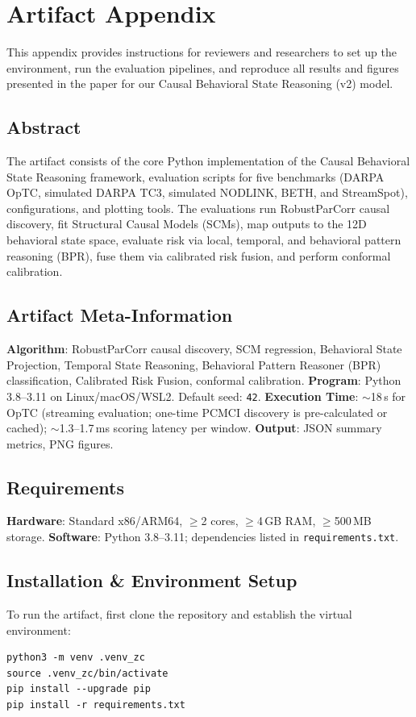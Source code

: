 \appendices

\section{Artifact Appendix}

This appendix provides instructions for reviewers and researchers to set up the environment, run the evaluation pipelines, and reproduce all results and figures presented in the paper for our Causal Behavioral State Reasoning (v2) model.

\subsection{Abstract}
The artifact consists of the core Python implementation of the Causal Behavioral State Reasoning framework, evaluation scripts for five benchmarks (DARPA OpTC, simulated DARPA TC3, simulated NODLINK, BETH, and StreamSpot), configurations, and plotting tools. The evaluations run RobustParCorr causal discovery, fit Structural Causal Models (SCMs), map outputs to the 12D behavioral state space, evaluate risk via local, temporal, and behavioral pattern reasoning (BPR), fuse them via calibrated risk fusion, and perform conformal calibration.

\subsection{Artifact Meta-Information}
\textbf{Algorithm}: RobustParCorr causal discovery, SCM regression, Behavioral State Projection, Temporal State Reasoning, Behavioral Pattern Reasoner (BPR) classification, Calibrated Risk Fusion, conformal calibration.
\textbf{Program}: Python 3.8--3.11 on Linux/macOS/WSL2. Default seed: \texttt{42}.
\textbf{Execution Time}: $\sim$18\,s for OpTC (streaming evaluation; one-time PCMCI discovery is pre-calculated or cached); $\sim$1.3--1.7\,ms scoring latency per window.
\textbf{Output}: JSON summary metrics, PNG figures.

\subsection{Requirements}
\textbf{Hardware}: Standard x86/ARM64, $\geq$2 cores, $\geq$4\,GB RAM, $\geq$500\,MB storage.
\textbf{Software}: Python 3.8--3.11; dependencies listed in \texttt{requirements.txt}.

\subsection{Installation \& Environment Setup}
To run the artifact, first clone the repository and establish the virtual environment:
\begin{lstlisting}
python3 -m venv .venv_zc
source .venv_zc/bin/activate
pip install --upgrade pip
pip install -r requirements.txt
\end{lstlisting}

